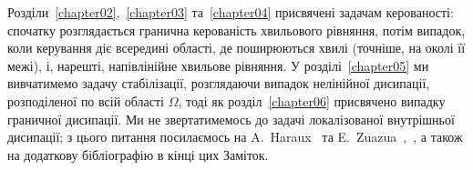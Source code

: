 Розділи~\ref{chapter02},~\ref{chapter03} та~\ref{chapter04} присвячені задачам керованості: спочатку розглядається гранична керованість хвильового рівняння, потім випадок, коли керування діє всередині області, де поширюються хвилі (точніше, на околі її межі), і, нарешті, напівлінійне хвильове рівняння. У розділі~\ref{chapter05} ми вивчатимемо задачу стабілізації, розглядаючи випадок нелінійної дисипації, розподіленої по всій області $\Omega$, тоді як розділ~\ref{chapter06} присвячено випадку граничної дисипації. Ми не звертатимемось до задачі локалізованої внутрішньої дисипації; з цього питання посилаємось на A.~Haraux~\cite{haraux1989remarque} та E.~Zuazua~\cite{zuazua1990exponential},~\cite{zuazua1991exponential}, а також на додаткову бібліографію в кінці цих Заміток.



